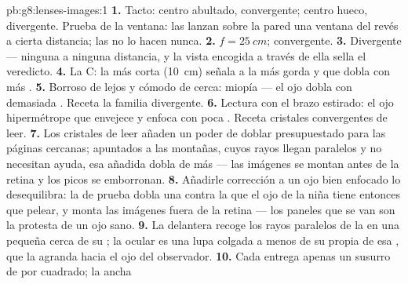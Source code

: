 \begin{solution}{pb:g8:lenses-images:1}
\textbf{1.} Tacto: centro abultado, convergente; centro hueco,
divergente. Prueba de la ventana: las  lanzan
sobre la pared una ventana del revés a cierta distancia; las
 no lo hacen nunca.
\textbf{2.} $f = \qty{25}{cm}$; convergente.
\textbf{3.} Divergente --- ninguna  a ninguna distancia,
y la vista encogida a través de ella sella el veredicto.
\textbf{4.} La C: la  más corta (\qty{10}{cm})
señala a la  más gorda y que dobla con más .
\textbf{5.} Borroso de lejos y cómodo de cerca: miopía --- el ojo dobla
con demasiada . Receta la familia divergente.
\textbf{6.} Lectura con el brazo estirado: el ojo hipermétrope que
envejece y enfoca con poca . Receta cristales convergentes de
leer.
\textbf{7.} Los cristales de leer añaden un poder de doblar
presupuestado para las páginas cercanas; apuntados a las montañas,
cuyos rayos llegan paralelos y no necesitan ayuda, esa  añadida
dobla de más --- las imágenes se montan antes de la retina y los
picos se emborronan.
\textbf{8.} Añadirle corrección a un ojo bien enfocado lo desequilibra:
la  de prueba dobla una  contra la que el ojo de la niña
tiene entonces que pelear, y monta las imágenes fuera de la
retina --- los paneles que se van son la protesta de un ojo sano.
\textbf{9.} La  delantera recoge los rayos paralelos de la
 en una pequeña  cerca de su ; la
 ocular es una lupa colgada a menos de su propia
 de esa , que la agranda hacia el
ojo del observador.
\textbf{10.} Cada  entrega apenas un susurro de
 por  cuadrado; la  ancha

\end{solution}
